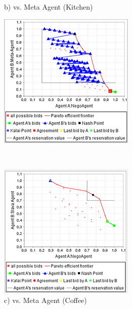 \documentclass[html]{report}    %
\begin{document}
\begin{figure}[htbp]
\begin{minipage}{.3\textwidth}
		\caption*{b) vs. Meta Agent (Kitchen)}
	\end{minipage}
	\begin{minipage}{.3\textwidth}
		\centering
		\includegraphics[width=.9\linewidth]{3}
		\caption*{c) vs. Meta Agent (Coffee)}
	\end{minipage} \\
	\begin{minipage}{.3\textwidth}
		\centering
		\includegraphics[width=.9\linewidth]{4}

\end{minipage}
\end{figure}
\end{document}
